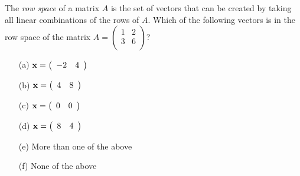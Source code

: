 \begin{problem}
    The \textit{row space} of a matrix $A$ is the set of vectors that can be created
    by taking all linear combinations of the rows of $A$.  Which of the following vectors is in
    the row space of the matrix 
    $A=\left( \begin{array}{cc} 1 & 2\\ 3 & 6 \\ \end{array} \right)$?

\begin{enumerate}
    \item[(a)] ${\bf x}=\left( \begin{array}{cc} -2& 4\\ \end{array} \right)$
\item[(b)] ${\bf x}=\left( \begin{array}{cc} 4& 8\\ \end{array} \right)$
\item[(c)] ${\bf x}=\left( \begin{array}{cc} 0& 0\\ \end{array} \right)$
\item[(d)] ${\bf x}=\left( \begin{array}{cc} 8& 4\\ \end{array} \right)$ 
\item[(e)] More than one of the above
\item[(f)] None of the above
\end{enumerate}
\end{problem}

%             


